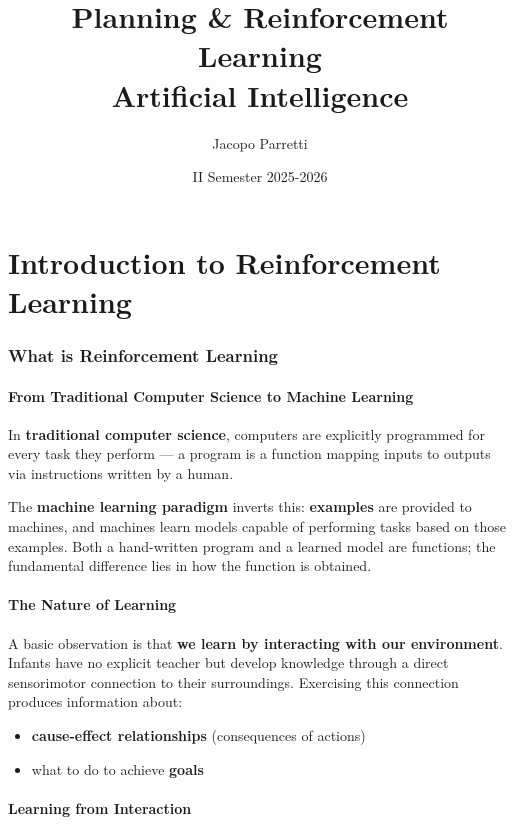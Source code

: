 \documentclass[11pt,a4paper]{article}
\title{\textbf{Planning \& Reinforcement Learning}\\
\large Artificial Intelligence}
\author{Jacopo Parretti}
\date{II Semester 2025-2026}
\theoremstyle{definition}
\theoremstyle{plain}
\theoremstyle{remark}
\begin{document}
\maketitle
\tableofcontents
\newpage


\part{Introduction to Reinforcement Learning}

\section{What is Reinforcement Learning}

\subsection{From Traditional Computer Science to Machine Learning}

In \textbf{traditional computer science}, computers are explicitly programmed for every task they perform — a program is a function mapping inputs to outputs via instructions written by a human.

The \textbf{machine learning paradigm} inverts this: \textbf{examples} are provided to machines, and machines learn models capable of performing tasks based on those examples. Both a hand-written program and a learned model are functions; the fundamental difference lies in how the function is obtained.

\subsection{The Nature of Learning}

A basic observation is that \textbf{we learn by interacting with our environment}. Infants have no explicit teacher but develop knowledge through a direct sensorimotor connection to their surroundings. Exercising this connection produces information about:
\begin{itemize}
    \item \textbf{cause-effect relationships} (consequences of actions)
    \item what to do to achieve \textbf{goals}
\end{itemize}

\subsection{Learning from Interaction}
\end{document}
